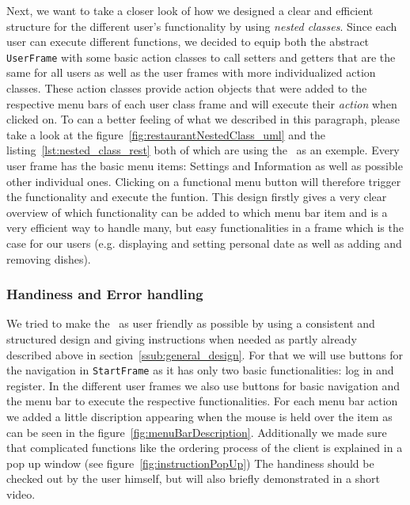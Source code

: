 Next, we want to take a closer look of how we designed a clear and efficient structure for the 
different user's functionality by using \emph{nested classes}. Since each user can execute 
different functions, we decided to equip both the abstract \lstinline|UserFrame| with some basic action classes to 
call setters and getters that are the same for all users as well as the user frames with more 
individualized action classes. These action classes provide action objects that were added to the 
respective menu bars of each user class frame and will execute their \textit{action} when clicked on. 
To can a better feeling of what we described in this paragraph, please take a look at the 
figure~\ref{fig:restaurantNestedClass_uml} and the listing~\ref{lst:nested_class_rest} both of which 
are using the \RestF~as an exemple. 
Every user frame has the basic menu items: Settings and Information as well as possible other 
individual ones. Clicking on a functional menu button will therefore trigger the functionality and 
execute the funtion. This design firstly gives a very clear overview of which functionality can be 
added to which menu bar item and is a very efficient way to handle many, but easy functionalities in 
a frame which is the case for our users (e.g. displaying and setting personal date as well as adding and 
removing dishes).

\subsubsection{Handiness and Error handling} %
\label{ssub:handling_of_the_gui}

We tried to make the \GUI~as user friendly as possible by using a consistent and structured design 
and giving instructions when needed as partly already described above in 
section~\ref{ssub:general_design}. For that we will use buttons for the navigation in
\lstinline|StartFrame| as it 
has only two basic functionalities: log in and register. In the different user frames we also use 
buttons for basic navigation and the menu bar to execute the respective functionalities. 
For each menu bar action we added a little discription appearing when the mouse is held over the item 
as can be seen in the figure~\ref{fig:menuBarDescription}. Additionally we made sure that complicated 
functions like the ordering process of the client is explained in a pop up window (see figure~\ref{fig:instructionPopUp})
The handiness should be checked out by the user himself, but will also briefly demonstrated in a 
short video.

